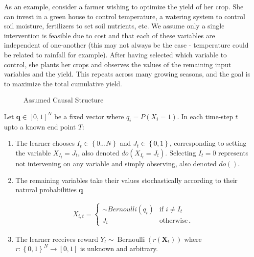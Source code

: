 \documentclass{article}
\newcommand{\set}[1]{\left\{#1\right\}}
\newcommand{\eq}[1]{\begin{align*}#1\end{align*}}
\newcommand{\Ber}{\operatorname{Bernoulli}}
\theoremstyle{plain}
\theoremstyle{definition}
\begin{document}
As an example, consider a farmer wishing to optimize the yield of her crop. She can invest in a green house to control temperature, a watering system to control soil moisture, fertilizers to set soil nutrients, etc. We assume only a single intervention is feasible due to cost and that each of these variables are independent of one-another (this may not always be the case - temperature could be related to rainfall for example). After having selected which variable to control, she plants her crops and observes the values of the remaining input variables and the yield. This repeats across many growing seasons, and the goal is to maximize the total cumulative yield.

\begin{figure}[h]
\centering
\caption{Assumed Causal Structure}
\label{fig:causalStructure}
\end{figure}



Let $\boldsymbol{q} \in [0,1]^N$ be a fixed vector where $q_i = P(X_i = 1)$. In each time-step $t$ upto a known end point $T$:
 
\begin{enumerate}
\item The learner chooses $I_t \in \set{0...N}$ and $J_t \in \set{0,1}$, corresponding to setting the variable $X_{I_t}=J_t$, also denoted $do(X_{I_t} = J_t)$. Selecting $I_t = 0$ represents not intervening on any variable and simply observing, also denoted $do()$.

\item The remaining variables take their values stochastically according to their natural probabilities $\boldsymbol{q}$

\eq{
X_{i,t} = \begin{cases}
\sim Bernoulli(q_i) &\text{if } i \neq I_t \\
J_t & \text{otherwise}\,.
\end{cases}
}

\item The learner receives reward $Y_t \sim \Ber(r(\boldsymbol{X}_t))$ where $r:\set{0,1}^N \to [0,1]$ is unknown and arbitrary.
\end{enumerate}
\end{document}
